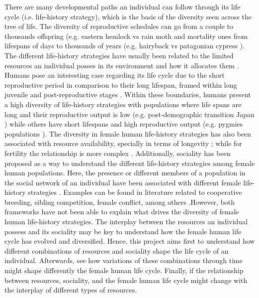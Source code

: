 \documentclass{article}
\begin{document}
There are many developmental paths an individual can follow through its life cycle (i.e. life-history strategy), which is the basis of the diversity seen across the tree of life. The diversity of reproductive schedules can go from a couple to thousands offspring (e.g. eastern hemlock vs rain moth \citep{tindale1932revision,van2017lifetime} and mortality ones from lifespans of days to thousands of years (e.g. hairyback vs patagonian cypress \citep{balsamo1988life,lara19933620}). The different life-history strategies have usually been related to the limited resources an individual posses in its environment and how it allocates them \citep{stearns2000life}. Humans pose an interesting case regarding its life cycle due to the short reproductive period in comparison to their long lifespan, framed within long juvenile and post-reproductive stages \citep{kaplan2000theory}. Within these boundaries, humans present a high diversity of life-history strategies with populations where life spans are long and their reproductive output is low (e.g. post-demographic transition Japan \citep{de2017maximum}) while others have short lifespans and high reproductive output (e.g. pygmies populations \citep{migliano2007life}). The diversity in female human life-history strategies has also been associated with resource availability, specially in terms of longevity \citep{kaplan2003embodied}; while for fertility the relationship is more complex \citep{mulder1998demographic,sear2016understanding}. Additionally, sociality has been proposed as a way to understand the different life-history strategies among female human populations. Here, the presence or different members of a population in the social network of an individual have been associated with different female life-history strategies \citep{sear2011much}. Examples can be found in literature related to cooperative breeding, sibling competition, female conflict, among others \citep{ivey2000cooperative,nitsch2013elder,mace2012female}.However, both frameworks have not been able to explain what drives the diversity of female human life-history strategies. The interplay between the resources an individual possess and its sociality may be key to understand how the female human life cycle has evolved and diversified. Hence,  this project aims first to understand how different combinations of resources and sociality shape the life cycle of an individual. Afterwards, see how variations of these combinations through time might shape differently the female human life cycle. Finally, if the relationship between resources, sociality, and the female human life cycle might change with the interplay of different types of resources.
\end{document}
